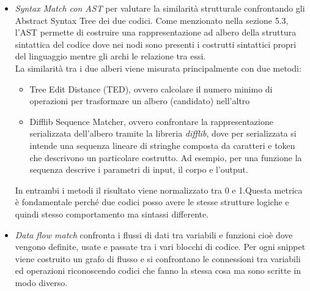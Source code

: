 \documentclass{article}
\begin{document}
\begin{itemize}
\begin{itemize}
        \item \textit{Syntax Match con AST} per valutare la similarità strutturale confrontando gli Abstract Syntax Tree dei due codici. Come menzionato nella sezione 5.3, l'AST permette di costruire una rappresentazione ad albero della struttura sintattica del codice dove nei nodi sono presenti i costrutti sintattici propri del linguaggio mentre gli archi le relazione tra essi.\\
        La similarità tra i due alberi viene misurata principalmente con due metodi:
        \begin{itemize}
            \item Tree Edit Distance (TED), ovvero calcolare il numero minimo di operazioni per trasformare un albero (candidato) nell’altro
            \item Difflib Sequence Matcher, ovvero confrontare la rappresentazione serializzata dell'albero tramite la libreria \textit{difflib}, dove per serializzata si intende una sequenza lineare di stringhe composta da caratteri e token che descrivono un particolare costrutto. Ad esempio, per una funzione la sequenza descrive i parametri di input, il corpo e l'output.
        \end{itemize}
        In entrambi i metodi il risultato viene normalizzato tra 0 e 1.Questa metrica è fondamentale perché due codici posso avere le stesse strutture logiche e quindi stesso comportamento ma sintassi differente.

        \item \textit{Data flow match} confronta i flussi di dati tra variabili e funzioni cioè dove vengono definite, usate e passate tra i vari blocchi di codice. Per ogni snippet viene costruito un grafo di flusso e si confrontano le connessioni tra variabili ed operazioni riconoscendo codici che fanno la stessa cosa ma sono scritte in modo diverso.
        

\end{itemize}
\end{itemize}
\end{document}
